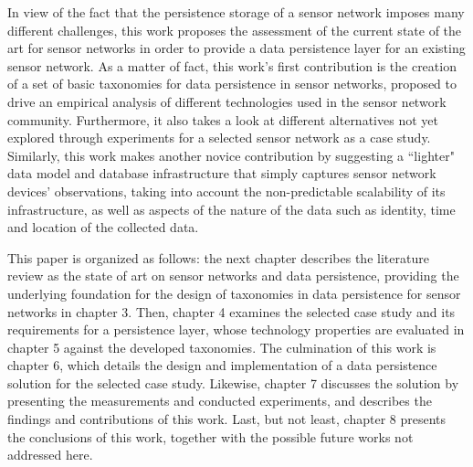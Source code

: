 In view of the fact that the persistence storage of a sensor network imposes
many different challenges, this work proposes the assessment of the current
state of the art for sensor networks in order to provide a data persistence
layer for an existing sensor network. As a matter of fact, this work's first
contribution is the creation of a set of basic taxonomies for data persistence
in sensor networks, proposed to drive an empirical analysis of different
technologies used in the sensor network community. Furthermore, it also takes a
look at different alternatives not yet explored through experiments for a
selected sensor network as a case study. Similarly, this work makes another
novice contribution by suggesting a ``lighter" data model and database
infrastructure that simply captures sensor network devices' observations,
taking into account the non-predictable scalability of its infrastructure, as
well as aspects of the nature of the data such as identity, time and location
of the collected data.

This paper is organized as follows: the next chapter describes the literature
review as the state of art on sensor networks and data persistence, providing
the underlying foundation for the design of taxonomies in data persistence for
sensor networks in chapter 3. Then, chapter 4 examines the selected case study
and its requirements for a persistence layer, whose technology properties are
evaluated in chapter 5 against the developed taxonomies. The culmination of
this work is chapter 6, which details the design and implementation of a data
persistence solution for the selected case study. Likewise, chapter 7 discusses
the solution by presenting the measurements and conducted experiments, and
describes the findings and contributions of this work. Last, but not least,
chapter 8 presents the conclusions of this work, together with the possible
future works not addressed here.
